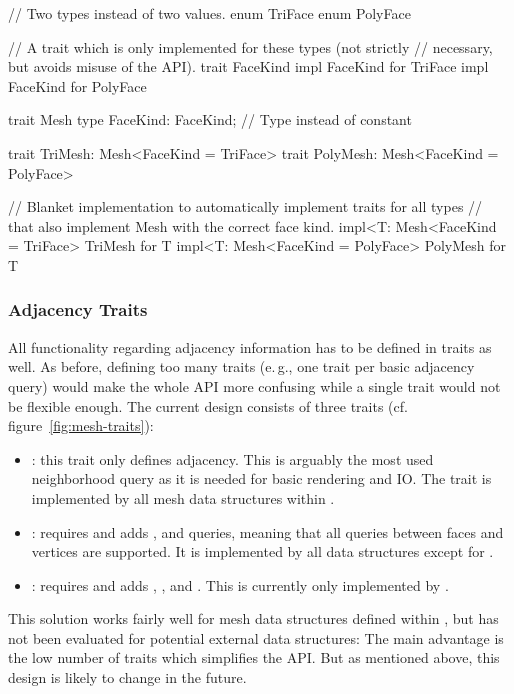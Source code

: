 \begin{rustcode}
  // Two types instead of two values.
  enum TriFace {}
  enum PolyFace {}

  // A trait which is only implemented for these types (not strictly
  // necessary, but avoids misuse of the API).
  trait FaceKind {}
  impl FaceKind for TriFace {}
  impl FaceKind for PolyFace {}

  trait Mesh {
      type FaceKind: FaceKind;  // Type instead of constant
  }

  trait TriMesh: Mesh<FaceKind = TriFace> {}
  trait PolyMesh: Mesh<FaceKind = PolyFace> {}

  // Blanket implementation to automatically implement traits for all types
  // that also implement Mesh with the correct face kind.
  impl<T: Mesh<FaceKind = TriFace> TriMesh for T {}
  impl<T: Mesh<FaceKind = PolyFace> PolyMesh for T {}
\end{rustcode}


\subsubsection*{Adjacency Traits}

All functionality regarding adjacency information has to be defined in traits as well.
As before, defining too many traits (e.\,g., one trait per basic adjacency query) would make the whole API more confusing while a single trait would not be flexible enough.
The current design consists of three traits (cf. figure~\ref{fig:mesh-traits}):

\begin{itemize}
  \item \textbf{}: this trait only defines  adjacency.
  This is arguably the most used neighborhood query as it is needed for basic rendering and IO.
  The trait is implemented by all mesh data structures within .
  \item \textbf{}: requires  and adds ,  and  queries, meaning that all queries between faces and vertices are supported.
  It is implemented by all data structures except for .
  \item \textbf{}: requires  and adds , ,  and .
  This is currently only implemented by .
\end{itemize}

This solution works fairly well for mesh data structures defined within , but has not been evaluated for potential external data structures:
The main advantage is the low number of traits which simplifies the API.
But as mentioned above, this design is likely to change in the future.

